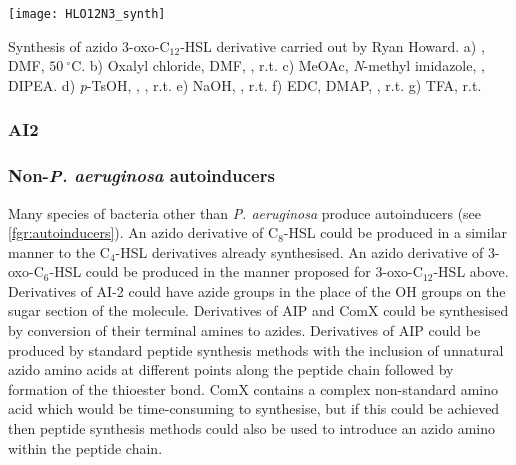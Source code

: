 \begin{scheme}[H]
	\begin{center}
		\texttt{[image: HLO12N3\_synth]}
		\caption{Synthesis of azido 3-oxo-C$_12$-HSL derivative  carried out by Ryan Howard.
		a) , DMF, $50\ ^{\circ}$C.
		b) Oxalyl chloride, DMF, , r.t.
		c) MeOAc, \textit{N}-methyl imidazole, , DIPEA.
		d) \textit{p}-TsOH, , , r.t.
		e) NaOH, , r.t.
		f) EDC, DMAP, , r.t.
		g) TFA, r.t.
		\label{sch:HLO12N3_synth}}
	\end{center}
\end{scheme}

\subsubsection{AI2}

\subsubsection{Non-\textit{P. aeruginosa} autoinducers \label{sec:FutAIP}}

Many species of bacteria other than \textit{P. aeruginosa} produce autoinducers \cite{Praneenararat2012} (see \ref{fgr:autoinducers}). An azido derivative of C$_8$-HSL  could be produced in a similar manner to the C$_4$-HSL derivatives already synthesised. An azido derivative of 3-oxo-C$_6$-HSL  could be produced in the manner proposed for 3-oxo-C$_12$-HSL  above. Derivatives of AI-2  could have azide groups in the place of the OH groups on the sugar section of the molecule. Derivatives of AIP  and ComX  could be synthesised by conversion of their terminal amines to azides.
Derivatives of AIP  could be produced by standard peptide synthesis methods with the inclusion of unnatural azido amino acids at different points along the peptide chain followed by formation of the thioester bond. ComX  contains a complex non-standard amino acid which would be time-consuming to synthesise, but if this could be achieved then peptide synthesis methods could also be used to introduce an azido amino within the peptide chain.

